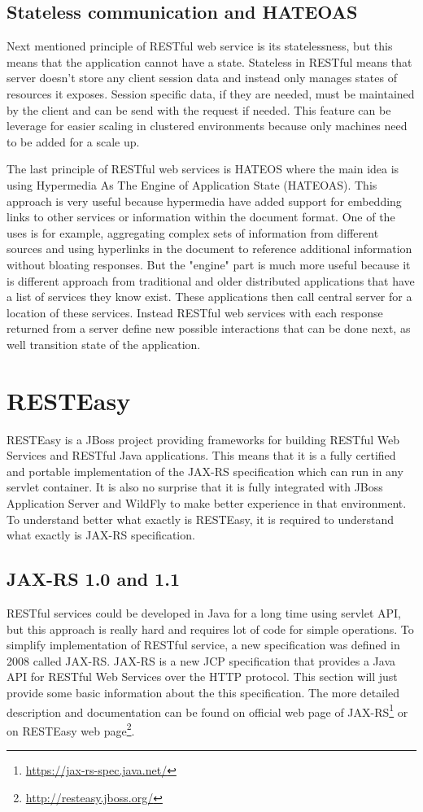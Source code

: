 \documentclass[12pt,final,oneside]{fithesis2}
\begin{document}
\subsection*{Stateless communication and HATEOAS}
Next mentioned principle of RESTful web service is its statelessness, but this means that the application cannot have a state. Stateless in RESTful means that server doesn't store any client session data and instead only manages states of resources it exposes. Session specific data, if they are needed, must be maintained by the client and can be send with the request if needed. This feature can be leverage for easier scaling in clustered environments because only machines need to be added for a scale up. 

The last principle of RESTful web services is HATEOS where the main idea is using Hypermedia As The Engine of Application State (HATEOAS). This approach is very useful because hypermedia have added support for embedding links to other services or information within the document format. One of the uses is for example, aggregating complex sets of information from different sources and using hyperlinks in the document to reference additional information without bloating responses. But the "engine" part is much more useful because it is different approach from traditional and older distributed applications that have a list of services they know exist. These applications then call central server for a location of these services. Instead RESTful web services with each response returned from a server define new possible interactions that can be done next, as well transition state of the application.

\section{RESTEasy}
RESTEasy is a JBoss project providing frameworks for building RESTful Web Services and RESTful Java applications. This means that it is a fully certified and portable implementation of the JAX-RS specification which can run in any servlet container. It is also no surprise that it is fully integrated with JBoss Application Server and WildFly to make better experience in that environment. To understand better what exactly is RESTEasy, it is required to understand what exactly is JAX-RS specification.\cite{resteasy-doc}

 
\subsection{JAX-RS 1.0 and 1.1}
RESTful services could be developed in Java for a long time using servlet API, but this approach is really hard and requires lot of code for simple operations. To simplify implementation of RESTful service, a new specification was defined in 2008 called JAX-RS. JAX-RS is a new JCP specification that provides a Java API for RESTful Web Services over the HTTP protocol. This section will just provide some basic information about the this specification. The more detailed description and documentation can be found on official web page of JAX-RS\footnote{\url{https://jax-rs-spec.java.net/}} or on RESTEasy web page\footnote{\url{http://resteasy.jboss.org/}}. 
\end{document}
